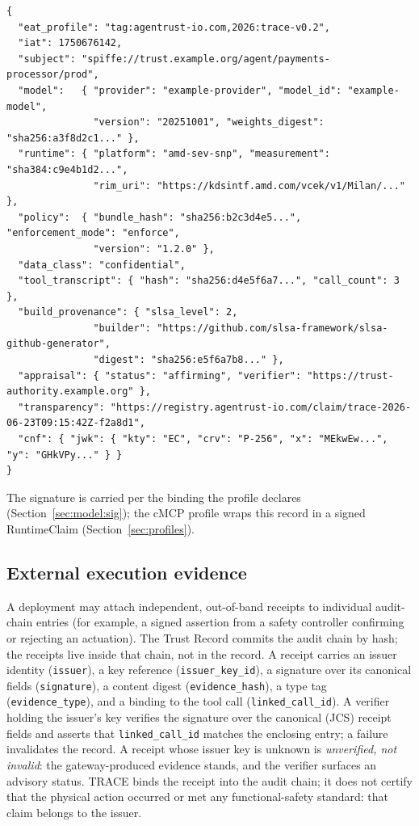 \begin{lstlisting}
{
  "eat_profile": "tag:agentrust-io.com,2026:trace-v0.2",
  "iat": 1750676142,
  "subject": "spiffe://trust.example.org/agent/payments-processor/prod",
  "model":   { "provider": "example-provider", "model_id": "example-model",
               "version": "20251001", "weights_digest": "sha256:a3f8d2c1..." },
  "runtime": { "platform": "amd-sev-snp", "measurement": "sha384:c9e4b1d2...",
               "rim_uri": "https://kdsintf.amd.com/vcek/v1/Milan/..." },
  "policy":  { "bundle_hash": "sha256:b2c3d4e5...", "enforcement_mode": "enforce",
               "version": "1.2.0" },
  "data_class": "confidential",
  "tool_transcript": { "hash": "sha256:d4e5f6a7...", "call_count": 3 },
  "build_provenance": { "slsa_level": 2,
               "builder": "https://github.com/slsa-framework/slsa-github-generator",
               "digest": "sha256:e5f6a7b8..." },
  "appraisal": { "status": "affirming", "verifier": "https://trust-authority.example.org" },
  "transparency": "https://registry.agentrust-io.com/claim/trace-2026-06-23T09:15:42Z-f2a8d1",
  "cnf": { "jwk": { "kty": "EC", "crv": "P-256", "x": "MEkwEw...", "y": "GHkVPy..." } }
}
\end{lstlisting}

The signature is carried per the binding the profile declares
(Section~\ref{sec:model:sig}); the cMCP profile wraps this record in a signed
RuntimeClaim (Section~\ref{sec:profiles}).

\subsection{External execution evidence}

A deployment may attach independent, out-of-band receipts to individual
audit-chain entries (for example, a signed assertion from a safety controller
confirming or rejecting an actuation). The Trust Record commits the audit chain by
hash; the receipts live inside that chain, not in the record. A receipt carries an
issuer identity (\texttt{issuer}), a key reference (\texttt{issuer\_key\_id}), a
signature over its canonical fields (\texttt{signature}), a content digest
(\texttt{evidence\_hash}), a type tag (\texttt{evidence\_type}), and a binding to the
tool call (\texttt{linked\_call\_id}). A verifier holding the issuer's key verifies
the signature over the canonical (JCS) receipt fields and asserts that
\texttt{linked\_call\_id} matches the enclosing entry; a failure invalidates the
record. A receipt whose issuer key is unknown is \emph{unverified, not invalid}: the
gateway-produced evidence stands, and the verifier surfaces an advisory status. TRACE
binds the receipt into the audit chain; it does not certify that the physical action
occurred or met any functional-safety standard: that claim belongs to the issuer.

